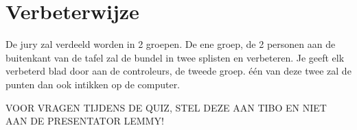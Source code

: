 \documentclass{exam}
\begin{document}
\section*{Verbeterwijze}
De jury zal verdeeld worden in 2 groepen. De ene groep, de 2 personen aan de buitenkant van de tafel zal de bundel in twee splisten en verbeteren. Je geeft elk verbeterd blad door aan de controleurs, de tweede groep. één van deze twee zal de punten dan ook intikken op de computer.\linebreak\par

\large{VOOR VRAGEN TIJDENS DE QUIZ, STEL DEZE AAN TIBO EN NIET AAN DE PRESENTATOR LEMMY!}
\newpage

%
%
%
%
\end{document}
